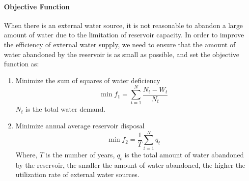 \paragraph{Objective Function}
When there is an external water source, it is not reasonable to abandon a large amount of water due to the limitation of reservoir capacity. In order to improve the efficiency of external water supply, we need to ensure that the amount of water abandoned by the reservoir is as small as possible, and set the objective function as:
\begin{enumerate}[(1)]
  \item Minimize the sum of squares of water deficiency
    \begin{equation}
      \min{f_1}=\sum^N_{t=1}\frac{N_t-W_t}{N_t}
    \end{equation}
    $N_t$ is the total water demand.
  \item Minimize annual average reservoir disposal
    \begin{equation}
      \min{f_2}=\frac{1}{T}\sum_{t=1}^N q_t
    \end{equation}
    Where, $T$ is the number of years, $q_t$ is the total amount of water abandoned by the reservoir, the smaller the amount of water abandoned, the higher the utilization rate of external water sources.
\end{enumerate}
